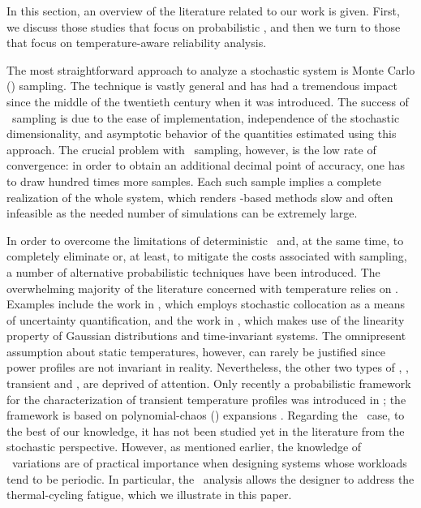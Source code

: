 In this section, an overview of the literature related to our work is given.
First, we discuss those studies that focus on probabilistic \ta, and then we turn to those that focus on temperature-aware reliability analysis.

The most straightforward approach to analyze a stochastic system is Monte Carlo (\MC) sampling.
The technique is vastly general and has had a tremendous impact since the middle of the twentieth century when it was introduced.
The success of \MC\ sampling is due to the ease of implementation, independence of the stochastic dimensionality, and asymptotic behavior of the quantities estimated using this approach.
The crucial problem with \MC\ sampling, however, is the low rate of convergence: in order to obtain an additional decimal point of accuracy, one has to draw hundred times more samples.
Each such sample implies a complete realization of the whole system, which renders \MC-based methods slow and often infeasible as the needed number of simulations can be extremely large.

In order to overcome the limitations of deterministic \ta\ and, at the same time, to completely eliminate or, at least, to mitigate the costs associated with  sampling, a number of alternative probabilistic techniques have been introduced.
The overwhelming majority of the literature concerned with temperature relies on \sssta.
Examples include the work in \cite{lee2013}, which employs stochastic collocation \cite{maitre2010} as a means of uncertainty quantification, and the work in \cite{juan2012}, which makes use of the linearity property of Gaussian distributions and time-invariant systems.
The omnipresent assumption about static temperatures, however, can rarely be justified since power profiles are not invariant in reality.
Nevertheless, the other two types of \ta, \ie, transient and \DSS, are deprived of attention.
Only recently a probabilistic framework for the characterization of transient temperature profiles was introduced in \cite{ukhov2014}; the framework is based on polynomial-chaos (\PC) expansions \cite{maitre2010}.
Regarding the \DSS\ case, to the best of our knowledge, it has not been studied yet in the literature from the stochastic perspective.
However, as mentioned earlier, the knowledge of \DSS\ variations are of practical importance when designing systems whose workloads tend to be periodic.
In particular, the \DSS\ analysis allows the designer to address the thermal-cycling fatigue, which we illustrate in this paper.

